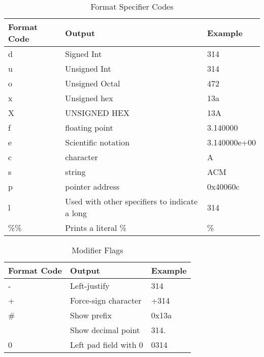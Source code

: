 \documentclass[letterpaper, 10pt]{report}
\begin{document}
\begin{table}[h]
    \caption{Format Specifier Codes \cite{cplusplus}}
    \begin{tabularx}{\textwidth}{|l|X|l|} \hline
        Format Code &   Output              &   Example     \\ \hline
        d           &   Signed Int          &   314         \\
        u           &   Unsigned Int        &   314         \\
        o           &   Unsigned Octal      &   472         \\
        x           &   Unsigned hex        &   13a         \\
        X           &   UNSIGNED HEX        &   13A         \\
        f           &   floating point      &   3.140000    \\
        e           &   Scientific notation &   3.140000e+00\\
        c           &   character           &   A           \\
        s           &   string              &   ACM         \\
        p           &   pointer address     &   0x40060c    \\
        l           &   Used with other specifiers to indicate a long & 314 \\
        \%\%        &   Prints a literal \% &   \%          \\
        \hline
    \end{tabularx}
\end{table}

\begin{table}[h]
    \caption{Modifier Flags \cite{cplusplus}}
    \begin{tabularx}{\textwidth}{|l|X|l|} \hline
        Format Code &   Output                  &   Example     \\ \hline
        -           &   Left-justify            &   314         \\
        +           &   Force-sign character    &   +314         \\
        \#           &   Show prefix             &   0x13a       \\
                    &   Show decimal point      &   314.        \\
        0           &   Left pad field with 0   &   0314       \\
        \hline
    \end{tabularx}
\end{table}
\end{document}
